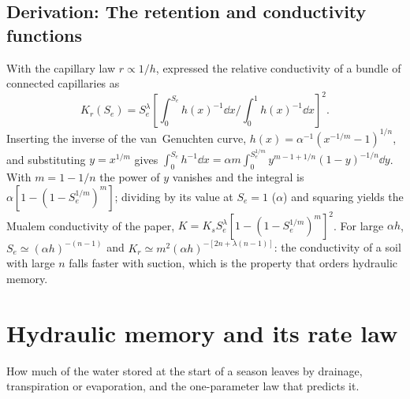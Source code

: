 \subsection{Derivation: The retention and conductivity functions}\label{der:s1:1}
With the capillary law $r\propto1/h$, \citet{Mualem1976} expressed the relative conductivity of a bundle of connected capillaries as
\begin{equation}K_r(S_e)=S_e^{\lambda}\left[\int_0^{S_e}h(x)^{-1}\dd x\Big/\int_0^{1}h(x)^{-1}\dd x\right]^{2}.\end{equation}
Inserting the inverse of the van~Genuchten curve, $h(x)=\alpha^{-1}(x^{-1/m}-1)^{1/n}$, and substituting $y=x^{1/m}$ gives $\int_0^{S_e}h^{-1}\dd x=\alpha m\int_0^{S_e^{1/m}}y^{m-1+1/n}(1-y)^{-1/n}\dd y$. With $m=1-1/n$ the power of $y$ vanishes and the integral is $\alpha[1-(1-S_e^{1/m})^m]$; dividing by its value at $S_e=1$ ($\alpha$) and squaring yields the Mualem conductivity of the paper, $K=K_sS_e^{\lambda}[1-(1-S_e^{1/m})^m]^2$. For large $\alpha h$, $S_e\simeq(\alpha h)^{-(n-1)}$ and $K_r\simeq m^2(\alpha h)^{-[2n+\lambda(n-1)]}$: the conductivity of a soil with large $n$ falls faster with suction, which is the property that orders hydraulic memory.


\section{Hydraulic memory and its rate law}
How much of the water stored at the start of a season leaves by drainage, transpiration or evaporation, and the one-parameter law that predicts it.

